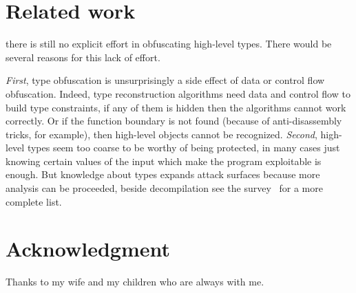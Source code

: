 \documentclass[compsoc,conference,a4paper,10pt,times]{IEEEtran}
\begin{document}
\section{Related work}
\noindent
there is still no explicit effort in obfuscating
high-level types. There would be several reasons for this lack of effort.

\emph{First}, type obfuscation is unsurprisingly a side effect of data or control flow obfuscation.
Indeed, type reconstruction algorithms need data and control flow to build type constraints,
if any of them is hidden
then the algorithms cannot work correctly. Or if the function boundary is not found
(because of anti-disassembly tricks, for example), then high-level objects cannot be recognized.
\emph{Second}, high-level types seem too coarse to be worthy
of being protected, in many cases just knowing certain values of the input which make the program
exploitable is enough. But knowledge about types expands attack surfaces because more analysis
can be proceeded, beside decompilation see the survey~\cite{caballero_type_2016} for a
more complete list.

\section*{Acknowledgment}
\noindent
Thanks to my wife and my children who are always with me.


\end{document}

